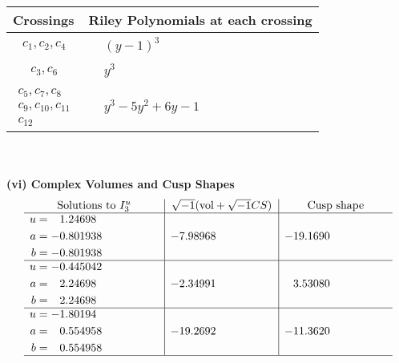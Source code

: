 \documentclass[1p]{elsarticle_modified}
\theoremstyle{definition}
\newcommand{\I}{\sqrt{-1}}
\begin{document}
\begin{tabular}{m{50pt}|m{274pt}}
Crossings & \hspace{64pt}Riley Polynomials at each crossing \\
\hline $$\begin{aligned}c_{1},c_{2},c_{4}\end{aligned}$$&$\begin{aligned}
&(y-1)^3
\end{aligned}$\\
\hline $$\begin{aligned}c_{3},c_{6}\end{aligned}$$&$\begin{aligned}
&y^3
\end{aligned}$\\
\hline $$\begin{aligned}c_{5},c_{7},c_{8}\\c_{9},c_{10},c_{11}\\c_{12}\end{aligned}$$&$\begin{aligned}
&y^3-5 y^2+6 y-1
\end{aligned}$\\
\hline
\end{tabular}\\~\\
\newpage\flushleft \textbf{(vi) Complex Volumes and Cusp Shapes}
$$\begin{array}{c|c|c}  
\text{Solutions to }I^u_{3}& \I (\text{vol} + \sqrt{-1}CS) & \text{Cusp shape}\\
 \hline 
\begin{aligned}
u &= \phantom{-}1.24698\phantom{ +0.000000I} \\
a &= -0.801938\phantom{ +0.000000I} \\
b &= -0.801938\phantom{ +0.000000I}\end{aligned}
 & -7.98968\phantom{ +0.000000I} & -19.1690\phantom{ +0.000000I} \\ \hline\begin{aligned}
u &= -0.445042\phantom{ +0.000000I} \\
a &= \phantom{-}2.24698\phantom{ +0.000000I} \\
b &= \phantom{-}2.24698\phantom{ +0.000000I}\end{aligned}
 & -2.34991\phantom{ +0.000000I} & \phantom{-}3.53080\phantom{ +0.000000I} \\ \hline\begin{aligned}
u &= -1.80194\phantom{ +0.000000I} \\
a &= \phantom{-}0.554958\phantom{ +0.000000I} \\
b &= \phantom{-}0.554958\phantom{ +0.000000I}\end{aligned}
 & -19.2692\phantom{ +0.000000I} & -11.3620\phantom{ +0.000000I}\\
 \hline 
 \end{array}$$\newpage
\end{document}
